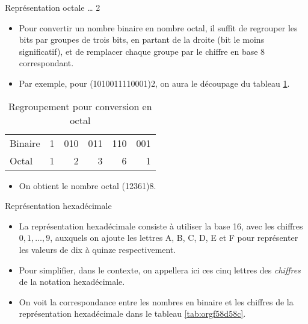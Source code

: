 \documentclass[presentation]{beamer}
\begin{document}
\begin{frame}[label={sec:org874420c}]{Représentation octale \ldots{} 2}
\begin{itemize}
\item Pour convertir un nombre binaire en nombre octal, il suffit de regrouper les bits par groupes de trois bits, en partant de la droite (bit le moins significatif), et de remplacer chaque groupe par le chiffre en base 8 correspondant.

\item Par exemple, pour (1010011110001)2, on aura le découpage du tableau \ref{tab:orgf398a72}.
\end{itemize}

\begin{table}[htbp]
\caption{\label{tab:orgf398a72}Regroupement pour conversion en octal}
\centering
\begin{tabular}{lrrrrr}
 &  &  &  &  & \\[0pt]
\hline
Binaire & 1 & 010 & 011 & 110 & 001\\[0pt]
Octal & 1 & 2 & 3 & 6 & 1\\[0pt]
\end{tabular}
\end{table}

\begin{itemize}
\item On obtient le nombre octal (12361)8.
\end{itemize}
\end{frame}

\begin{frame}[label={sec:orgee36f04}]{Représentation hexadécimale}
\begin{itemize}
\item La représentation hexadécimale consiste à utiliser la base 16, avec les chiffres \(0, 1, \ldots, 9\), auxquels on ajoute les lettres A, B, C, D, E et F pour représenter les valeurs de dix à quinze respectivement.

\item Pour simplifier, dans le contexte, on appellera ici ces cinq lettres des \emph{chiffres} de la notation hexadécimale.

\item On voit la correspondance entre les nombres en binaire et les chiffres de la représentation hexadécimale dans le tableau \ref{tab:orgf58d58c}.
\end{itemize}
\end{frame}
\end{document}
